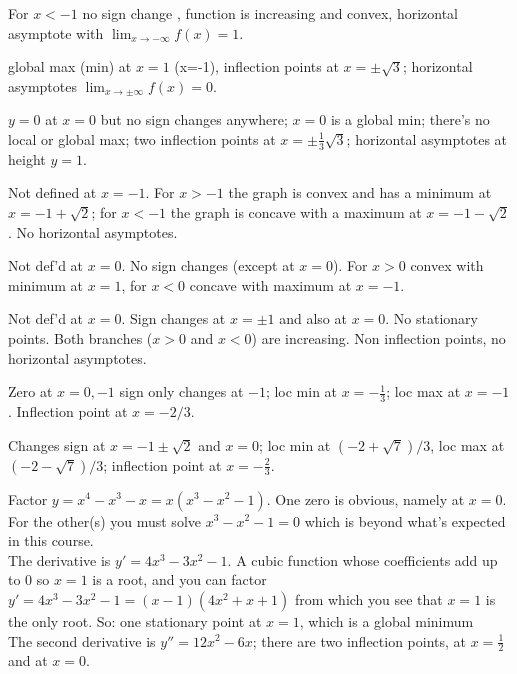 For $x<-1$ no sign change , function is increasing and convex, horizontal
asymptote with $\lim_{x\to-\infty}f(x) = 1$.
\bigskip

\item[{\bfseries(V12.24)}]
global max (min) at $x=1$ (x=-1), inflection points at $x=\pm\surd3$;
horizontal asymptotes $\lim_{x\to \pm\infty}f(x) = 0$.
\bigskip

\item[{\bfseries(V12.25)}]
$y=0$ at $x=0$ but no sign changes anywhere;  $x=0$ is a global min;
there's no local or global max;  two inflection points at
$x=\pm\frac13\surd3$; horizontal asymptotes at height $y=1$.
\bigskip

\item[{\bfseries(V12.26)}]
Not defined at $x=-1$.  For $x>-1$ the graph is convex and has a
minimum at $x=-1+\surd2$;  for $x<-1$ the graph is concave with a
maximum at $x=-1-\surd2$.  No horizontal asymptotes.
\bigskip

\item[{\bfseries(V12.27)}]
Not def'd at $x=0$. No sign changes (except at $x=0$).
For $x>0$ convex with minimum at $x=1$, for $x<0$ concave
with maximum at $x=-1$.
\bigskip

\item[{\bfseries(V12.28)}]
Not def'd at $x=0$. Sign changes at $x=\pm1$ and also at $x=0$.
No stationary points.  Both branches ($x>0$ and $x<0$) are
increasing.  Non inflection points, no horizontal asymptotes.
\bigskip

\item[{\bfseries(V12.29)}]
Zero at $x=0, -1 $ sign only changes at $-1$;  loc min at
$x=-\frac13$; loc max at $x=-1$.  Inflection point at $x=-2/3$.
\bigskip

\item[{\bfseries(V12.30)}]
Changes sign at $x=-1\pm\surd2$ and $x=0$; loc min at
$(-2+\surd7)/3$, loc max at $(-2-\surd7)/3$; inflection point at
$x=-\frac23$.
\bigskip

\item[{\bfseries(V12.31)}]
Factor $y=x^4-x^3-x=x(x^3-x^2-1)$.  One zero is obvious, namely
at $x=0$.  For the other(s) you must solve $x^3-x^2-1=0$ which is
beyond what's expected in this course.\\
The derivative is $y'=4x^3-3x^2-1$.  A cubic function whose
coefficients add up to 0 so $x=1$ is a root, and you can factor
$y'=4x^3-3x^2-1= (x-1)(4x^2+x+1)$ from which you see that $x=1$
is the only root.  So: one stationary point at $x=1$, which is a
global minimum\\
The second derivative is $y''=12x^2-6x$; there are two inflection
points, at $x=\frac12$ and at $x=0$.
\bigskip

